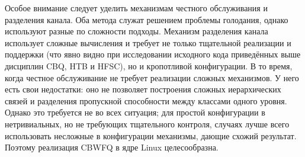 	Особое внимание следует уделить механизмам честного обслуживания и
	разделения канала. Оба метода служат решением проблемы голодания,
	однако используют разные по сложности подходы. Механизм разделения канала
	использует сложные вычисления и требует не только тщательной реализации
	и поддержки (что явно видно при исследовании исходного кода
	приведённых выше дисциплин CBQ, HTB и HFSC), но и кропотливой конфигурации. 
	В то время, когда честное обслуживание не требует реализации сложных механизмов.
	У него есть свои недостатки: оно не позволяет построения сложных иерархических
	связей и разделения пропускной способности между классами одного уровня. 
	Однако это требуется не во всех ситуация; для простой конфигурации
	в нетривиальных, но не требующих тщательного контроля, случаях
	лучше всего использовать несложные в конфигурации механизмы, дающие
	схожий результат. Поэтому реализация CBWFQ в ядре Linux целесообразна.
